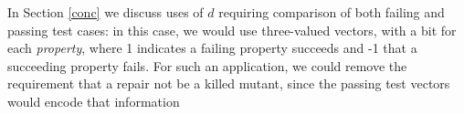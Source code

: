 In Section \ref{conc} we discuss uses of $d$
requiring comparison of both failing and passing test cases:  in this 
case, we would use three-valued vectors, with a bit for each \emph{property}, where 1 indicates a 
failing property succeeds and -1 that a succeeding property 
fails.  For such an application, we could remove the requirement that
a repair not be a killed mutant, since the passing test vectors would encode
that information